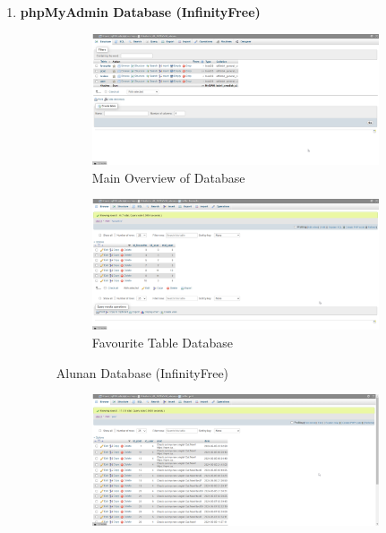 \begin{enumerate}[1.]
    \item \textbf{phpMyAdmin Database (InfinityFree)}
    \begin{figure}[h]
        \centering
        \begin{subfigure}[b]{1.0\textwidth}
            \centering
            \includegraphics[width=\textwidth]{mainmatter/images/backend/ifall.png}
            \caption{Main Overview of Database}
            \vspace{0.8cm}
            \label{fig:sub1}
        \end{subfigure}
        \hspace{0.08\textwidth}
        \begin{subfigure}[b]{1.0\textwidth}
            \centering
            \includegraphics[width=\textwidth]{mainmatter/images/backend/iffav.png}
            \caption{Favourite Table Database}
            \label{fig:sub2}
        \end{subfigure}
        \caption{Alunan Database (InfinityFree)}
        \label{fig:myfig72a}
    \end{figure}
    \clearpage
    \begin{figure}[h]
        \centering
        \begin{subfigure}[b]{1.0\textwidth}
            \centering
            \includegraphics[width=\textwidth]{mainmatter/images/backend/ifpost.png}

\end{subfigure}
\end{figure}
\end{enumerate}
